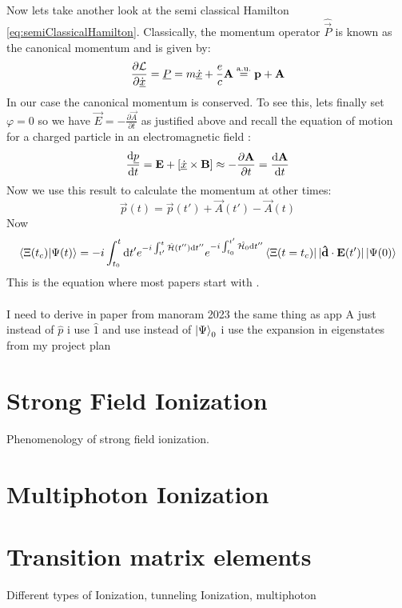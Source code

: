 Now lets take another look at the semi classical Hamilton \eqref{eq:semiClassicalHamilton}. Classically, the momentum operator $\hat{\vec{P}}$ is known as the canonical momentum and is given by:
\begin{equation*}
    \frac{\partial \mathcal{L}}{\partial \dot{\underline{x}}} = \underline{P} = m\underline{\dot{x}} + \frac{e}{c}\mathbf{A} \stackrel{\mathrm{a.u.}}{=} \mathbf{p} + \mathbf{A}
\end{equation*}
In our case the canonical momentum is conserved. To see this, lets finally set $\varphi=0$ so we have $\vec{E} = -\frac{\partial \vec{A}}{\partial t}$ as justified above and recall the equation of motion for a charged particle in an electromagnetic field \cite{LandauLifschitzBand2}:
\begin{equation*}
    \frac{\mathrm{d}\underline{p}}{\mathrm{d} t} = \mathbf{E} + \left[\underline{\dot{x}}\times\mathbf{B}\right] \approx -\frac{\partial \mathbf{A}}{\partial t} = \frac{\mathrm{d} \mathbf{A}}{\mathrm{d} t}
\end{equation*}
Now we use this result to calculate the momentum at other times:
\begin{equation*}
    \vec{p}(t) = \vec{p}(t') + \vec{A}(t') - \vec{A}(t)
\end{equation*}
Now
\begin{equation}
    \braket{\Xi(t_c)|\Psi(t)} = -i \int_{t_0}^{t} \mathrm{d} t' e^{-i \int_{t'}^{t} \hat{\mathcal{H}}(t'') \mathrm{d} t''}e^{-i \int_{t_0}^{t'} \hat{\mathcal{H}_0} \mathrm{d} t''} \bra{\Xi(t=t_c)}|\mathbf{\hat{d}}\cdot\mathbf{E}(t')|\ket{\Psi(0)}
\end{equation}
This is the equation where most papers start with \cite{Theory_NPS}.\\\\



I need to derive in paper from manoram 2023 the same thing as app A just instead of $\hat{p}$ i use $\hat{1}$ and use instead of $\ket{\Psi}_0$ i use the expansion in eigenstates from my project plan







\newpage
\section{Strong Field Ionization}

Phenomenology of strong field ionization.










\newpage
\section{Multiphoton Ionization}


\newpage
\section{Transition matrix elements}



Different types of Ionization, tunneling Ionization, multiphoton